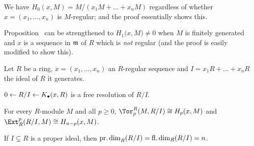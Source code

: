 \documentclass[a4paper,parskip=half,numbers=enddot, DIV=12]{scrreprt}
\renewcommand{\geq}{\geqslant}
\begin{document}
\begin{rem*}
	\begin{alphanumerate}
		\item We have $H_0(x,M)=M/(x_1M+\ldots+x_nM)$ regardless of whether $x=(x_1,\ldots,x_n)$ is $M$-regular; and the proof essentially shows this.
		\item Proposition~ can be strengthened to $H_1\big(x,M\big)\neq 0$ when $M$ is finitely generated and $x$ is a sequence in $\mathfrak{m}$ of $R$ which is \emph{not} regular (and the proof is easily modified to show this).
	\end{alphanumerate}
\end{rem*}
\begin{fact}
	Let $R$ be a ring, $x=(x_1,\ldots,x_n)$ an $R$-regular sequence and $I=x_1R+\ldots+x_nR$ the ideal of $R$ it generates.
	\begin{alphanumerate}
		\item $0\lmorphism R/I\lmorphism K_\bullet(x,R)$ is a free resolution of $R/I$.
		\item For every $R$-module $M$ and all $p\geq 0$, $\Tor_p^R(M,R/I)\cong H_p(x,M)$ and  $\Ext_R^p(R/I,M)\cong H_{n-p}(x,M)$.
		\item If $I\subsetneq R$ is a proper ideal, then $\operatorname{pr.dim}_R(R/I)=\operatorname{fl.dim}_R(R/I)= n$.
	\end{alphanumerate}
\end{fact}
\end{document}
